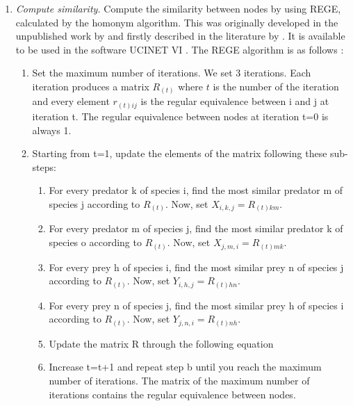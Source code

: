 \begin{enumerate}

  \item \emph{Compute similarity.} \smallskip \newline
  Compute the similarity between nodes by using REGE, calculated by the homonym algorithm. This was originally developed in the unpublished work by \citet{White1980,White1982,White1984} and firstly described in the literature by \citet{Borgatti1993}. It is available to be used in the software UCINET VI \citet{Borgatti2002}. The REGE algorithm is as follows \citep{Jordan2018}:

          \begin{enumerate}

            \item Set the maximum number of iterations. We set 3 iterations. Each iteration produces a matrix $R_{\left(t\right)}$ where $t$ is the number of the iteration and every element $r_{\left(t\right)ij}$ is the regular equivalence between i and j at iteration t. The regular equivalence between nodes at iteration t=0 is always 1.

            \item Starting from t=1, update the elements of the matrix following these sub-steps:

                  \begin{enumerate}
                    \item For every predator k of species i, find the most similar predator m of species j according to  $R_{\left(t\right)}$.
                          Now, set $X_{i,k,j}=R_{\left(t\right)km}.$
                    \item For every predator m of species j, find the most similar predator k of species o according to $R_{\left(t\right)}$.
                          Now, set $X_{j,m,i}=R_{\left(t\right)mk}$.
                    \item For every prey h of species i, find the most similar prey n of species j according to $R_{\left(t\right)}$.
                          Now, set $Y_{i,h,j}=R_{\left(t\right)hn}$.
                    \item For every prey n of species j, find the most similar prey h of species i according to $R_{\left(t\right)}$.
                          Now, set $Y_{j,n,i}=R_{\left(t\right)nh}$.
                    \item Update the matrix R through the following equation
                    \item Increase t=t+1 and repeat step b until you reach the maximum number of iterations. The matrix of the maximum number of iterations contains the regular equivalence between nodes.
                  \end{enumerate}


\end{enumerate}
\end{enumerate}
